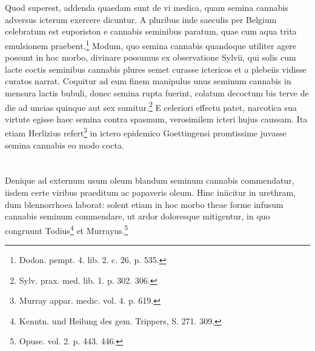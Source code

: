 \documentclass[a4paper, 11pt, oneside, polutonikogreek, german]{article}
\begin{document}
\section{}
\paragraph{}
Quod superest, addenda quaedam sunt de vi medica, quam semina cannabis adversus icterum exercere dicuntur. A pluribus inde saeculis per Belgium celebratum est euporiston e cannabis seminibus paratum, quae cum aqua trita emulsionem praebent.\footnote{Dodon. pempt. 4. lib. 2. c. 26. p. 535.} Modum, quo semina cannabis quandoque utiliter agere possunt in hoc morbo, divinare possumus ex observatione Sylvii, qui solis cum lacte coctis seminibus cannabis plures semet curasse ictericos et a plebeiis vidisse curatos narrat. Coquitur ad eum finem manipulus unus seminum cannabis in mensura lactis bubuli, donec semina rupta fuerint, colatum decoctum bis terve de die ad uncias quinque aut sex sumitur.\footnote{Sylv. prax. med. lib. 1. p. 302. 306.} E celeriori effectu patet, narcotica sua virtute egisse haec semina contra spasmum, verosimilem icteri hujus caussam. Ita etiam Herlizius refert\footnote{Murray appar. medic. vol. 4. p. 619.} in ictero epidemico Goettingensi promtissime juvasse semina cannabis eo modo cocta.
\section{}
\paragraph{}
Denique ad externum usum oleum blandum seminum cannabis commendatur, iisdem certe viribus praeditum ac papaveris oleum. Hinc iniicitur in urethram, dum blennorrhoea laborat: solent etiam in hoc morbo theae forme infusum cannabis seminum commendare, ut ardor doloresque mitigentur, in quo congruunt Todius\footnote{Kenntn. und Heilung des gem. Trippers, S. 271. 309.} et Murrayus.\footnote{Opuse. vol. 2. p. 443. 446.}
\clearpage
\end{document}
